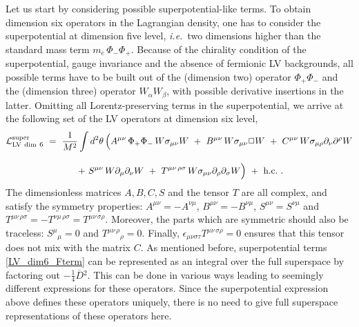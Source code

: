 \documentclass[12pt]{revtex4}
\begin{document}
Let us start by considering possible superpotential-like terms. 
To obtain dimension six operators in the Lagrangian density, 
one has to consider the superpotential at dimension five level, 
{\em i.e.}\ two dimensions higher than the standard mass term $m_e\,
\Phi_-\Phi_+$. Because of the chirality condition  of the
superpotential, gauge invariance and the absence of 
fermionic LV backgrounds,  all possible terms have to be built out of the
(dimension two) operator $\Phi_+ \Phi_-$ and the (dimension three)
operator $W_\alpha W_\beta$, with possible derivative insertions in  
the latter. Omitting all Lorentz-preserving terms in the
superpotential, we arrive at the following set of the LV operators at
dimension six level,  
%
\begin{gather} 
{\cal L}_{\rm{LV\ dim\ 6}}^{\rm{super}} ~=~ \frac{1}{M^2}
\int d^2 \theta \, \Big( 
A^{\mu\nu} \, \Phi_+ \Phi_-\, W \sigma_{\mu\nu} W ~+~ 
B^{\mu\nu} \, W \sigma_{\mu\nu} \Box W ~+~ 
C^{\mu\nu} \, W \sigma_{\mu\rho} \partial_\nu \partial^\rho W 
\nonumber \\[2ex]
~+~ 
S^{\mu\nu}\, W \partial_\mu \partial_\nu W ~+~ 
T^{\mu\nu\, \rho\sigma} \, 
W \sigma_{\mu\nu} \partial_\rho \partial_\sigma W 
\Big) ~+~ \text{h.c.}~. 
\label{LV_dim6_Fterm}
\end{gather}
%
The dimensionless matrices $A, B, C, S$ and the tensor $T$ are all complex,
and satisfy the symmetry properties: $A^{\mu\nu} = -A^{\nu\mu}$, 
$B^{\mu\nu} = -B^{\nu\mu}$, 
$S^{\mu\nu} =S^{\nu\mu}$ and 
$T^{\mu\nu\, \rho\sigma} = -T^{\nu\mu\, \rho\sigma} = 
T^{\mu\nu\, \sigma\rho}$. Moreover, the parts which are symmetric
should also be traceless: $S^\mu{}_\mu=0$ and 
$T^{\mu\nu\, \rho}{}_\rho = 0$. Finally,  
$\epsilon_{\mu\nu\sigma\tau}T^{\mu\nu\, \sigma\rho} = 0$ ensures that
this tensor does not mix with the matrix $C$. As mentioned before,
superpotential terms \eqref{LV_dim6_Fterm} can be represented as an
integral over the full superspace by factoring out $-\frac 14
\overline{D}{}^2$. This can be done in various ways leading to
seemingly different expressions for these operators. Since the
superpotential expression above defines these operators uniquely,
there is no need to give full superspace representations of 
these operators here. 
\end{document}
